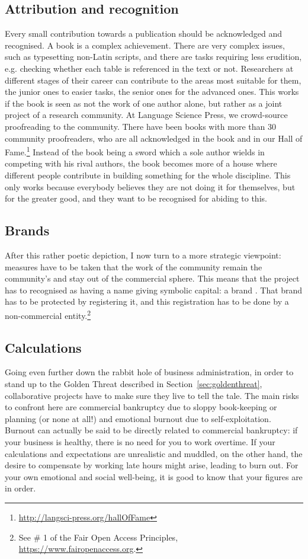 \documentclass[12pt]{article}
\begin{document}
\subsection{Attribution and recognition}
Every small contribution towards a publication should be acknowledged and recognised. A book is a complex achievement. There are very complex issues, such as typesetting non-Latin scripts, and there are tasks requiring less erudition, e.g. checking whether each table is referenced in the text or not. Researchers at different stages of their career can contribute to the areas most suitable for them, the junior ones to easier tasks, the senior ones for the advanced ones. This works if the book is seen as not the work of one author alone, but rather as a joint project of a research community. At Language Science Press, we crowd-source proofreading to the community. There have been books with more than 30 community proofreaders, who are all acknowledged in the book and in our Hall of Fame.\footnote{\url{http://langsci-press.org/hallOfFame}} Instead of the book being a sword which a sole author wields in competing with his rival authors, the book becomes more of a house where different people contribute in building something for the whole discipline. This only works because everybody believes they are not doing it for themselves, but for the greater good, and they want to be recognised for abiding to this. 

\subsection{Brands}
After this rather poetic depiction, I now turn to a more strategic viewpoint: measures have to be taken that the work of the community remain the community's and stay out of the commercial sphere. This means that the project has to recognised as having a name giving symbolic capital: a brand \citep{Haspelmath2013}. That brand has to be protected by registering it, and this registration has to be done by a non-commercial entity.\footnote{See \# 1 of the Fair Open Access Principles, \url{https://www.fairopenaccess.org}.}


\subsection{Calculations}
Going even further down the rabbit hole of business administration, in order to stand up to the Golden Threat described in Section~\ref{sec:goldenthreat}, collaborative projects have to make sure they live to tell the tale. The main risks to confront here are commercial bankruptcy due to sloppy book-keeping or planning (or none at all!) and emotional burnout due to self-exploitation. Burnout can actually be said to be directly related to commercial bankruptcy: if your business is healthy, there is no need for you to work overtime. If your calculations and expectations are unrealistic and muddled, on the other hand, the desire to compensate by working late hours might arise, leading to burn out. For your own emotional and social well-being, it is good to know that your figures are in order. 
\end{document}
